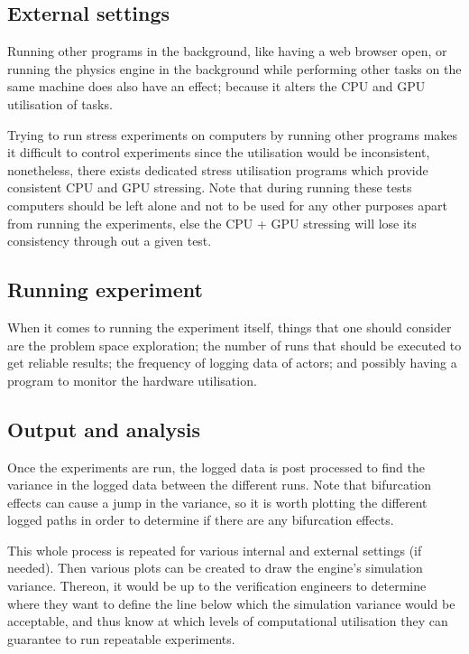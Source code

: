 \subsection{External settings}
Running other programs in the background, like having a web browser open, or running the physics engine in the background while performing other tasks on the same machine does also have an effect; because it alters the CPU and GPU utilisation of tasks.

Trying to run stress experiments on computers by running other programs makes it difficult to control experiments since the utilisation would be inconsistent, nonetheless, there exists dedicated stress utilisation programs which provide consistent CPU and GPU stressing. Note that during running these tests computers should be left alone and not to be used for any other purposes apart from running the experiments, else the CPU + GPU stressing will lose its consistency through out a given test. 

\subsection{Running experiment}
\noindent When it comes to running the experiment itself, things that one should consider are the problem space exploration; the number of runs that should be executed to get reliable results; the frequency of logging data of actors; and possibly having a program to monitor the hardware utilisation.

\subsection{Output and analysis}
Once the experiments are run, the logged data is post processed to find the variance in the logged data between the different runs. Note that bifurcation effects can cause a jump in the variance, so it is worth plotting the different logged paths in order to determine if there are any bifurcation effects.

This whole process is repeated for various internal and external settings (if needed). 
Then various plots can be created to draw the engine's simulation variance. 
Thereon, it would be up to the verification engineers to determine where they want to define the line below which the simulation variance would be acceptable, and thus know at which levels of computational utilisation they can guarantee to run repeatable experiments.   

